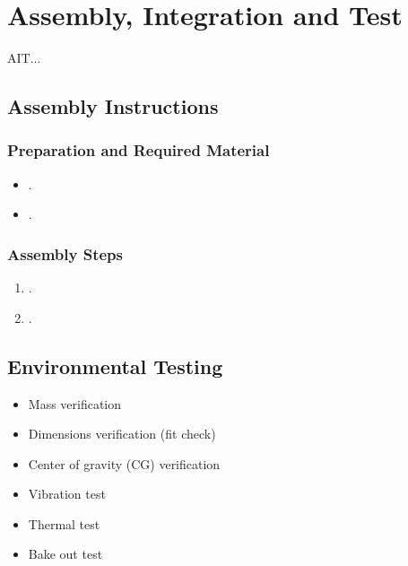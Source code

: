 %
%
%
%
%

%
%
%
%
%
%

\chapter{Assembly, Integration and Test} \label{ch:ait}

AIT...

\section{Assembly Instructions}

\subsection{Preparation and Required Material}

\begin{itemize}
    \item .
    \item .
\end{itemize}

\subsection{Assembly Steps}

\begin{enumerate}
    \item .
    \item .
\end{enumerate}

\section{Environmental Testing}

\begin{itemize}
    \item Mass verification
    \item Dimensions verification (fit check)
    \item Center of gravity (CG) verification
    \item Vibration test
    \item Thermal test
    \item Bake out test
\end{itemize}

